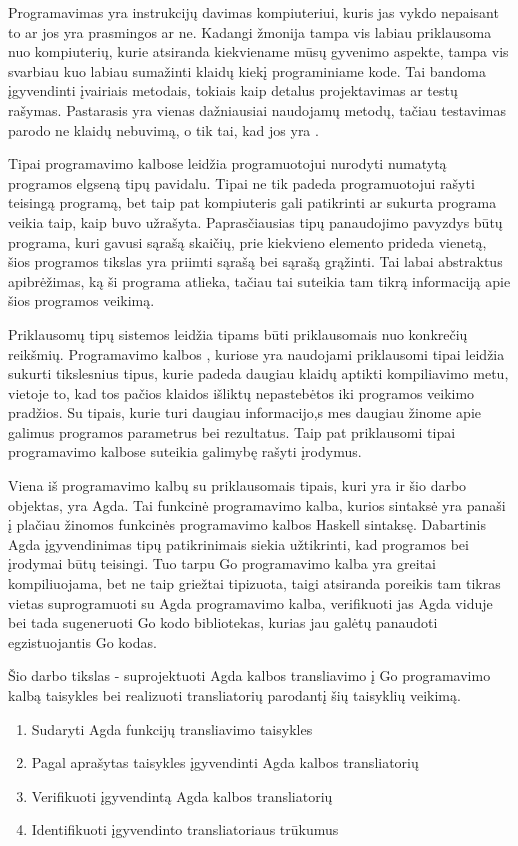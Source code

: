 \documentclass{VUMIFPSkursinis}
\begin{document}
\tableofcontents


Programavimas yra instrukcijų davimas kompiuteriui, kuris jas vykdo nepaisant to ar jos yra prasmingos ar ne. Kadangi žmonija tampa vis labiau priklausoma nuo kompiuterių, kurie atsiranda kiekviename mūsų gyvenimo aspekte, tampa vis svarbiau kuo labiau sumažinti klaidų kiekį programiniame kode. Tai bandoma įgyvendinti įvairiais metodais, tokiais kaip detalus projektavimas ar testų rašymas. Pastarasis yra vienas dažniausiai naudojamų metodų, tačiau testavimas parodo ne klaidų nebuvimą, o tik tai, kad jos yra \cite{UHC}.
\par Tipai programavimo kalbose leidžia programuotojui nurodyti numatytą programos elgseną tipų pavidalu. Tipai ne tik padeda programuotojui rašyti teisingą programą, bet taip pat kompiuteris gali patikrinti ar sukurta programa veikia taip, kaip buvo užrašyta. Paprasčiausias tipų panaudojimo pavyzdys būtų programa, kuri gavusi sąrašą skaičių, prie kiekvieno elemento prideda vienetą, šios programos tikslas yra priimti sąrašą bei sąrašą grąžinti. Tai labai abstraktus apibrėžimas, ką ši programa atlieka, tačiau tai suteikia tam tikrą informaciją apie šios programos veikimą.\par
Priklausomų tipų sistemos \cite{schematicApproach} leidžia tipams būti priklausomais nuo konkrečių reikšmių. Programavimo kalbos \cite{agda_book,idris}, kuriose yra naudojami priklausomi tipai leidžia sukurti tikslesnius tipus, kurie padeda daugiau klaidų aptikti kompiliavimo metu, vietoje to, kad tos pačios klaidos išliktų nepastebėtos iki programos veikimo pradžios. Su tipais, kurie turi daugiau informacijo,s mes daugiau žinome apie galimus programos parametrus bei rezultatus. Taip pat priklausomi tipai programavimo kalbose suteikia galimybę rašyti įrodymus.
\par Viena iš programavimo kalbų su priklausomais tipais, kuri yra ir šio darbo objektas, yra Agda. Tai funkcinė programavimo kalba, kurios sintaksė yra panaši į plačiau žinomos funkcinės programavimo kalbos Haskell \cite{haskell} sintaksę. Dabartinis Agda įgyvendinimas tipų patikrinimais siekia užtikrinti, kad programos bei įrodymai būtų teisingi. Tuo tarpu Go programavimo kalba \cite{Go} yra greitai kompiliuojama, bet ne taip griežtai tipizuota, taigi atsiranda poreikis tam tikras vietas suprogramuoti su Agda programavimo kalba, verifikuoti jas Agda viduje bei tada sugeneruoti Go kodo bibliotekas, kurias jau galėtų panaudoti egzistuojantis Go kodas.\par Šio darbo tikslas - suprojektuoti Agda kalbos transliavimo į Go programavimo kalbą taisykles bei realizuoti transliatorių parodantį šių taisyklių veikimą.
\begin{enumerate}[noitemsep]
	\item Sudaryti Agda funkcijų transliavimo taisykles
	\item Pagal aprašytas taisykles įgyvendinti Agda kalbos transliatorių
	\item Verifikuoti įgyvendintą Agda kalbos transliatorių
	\item Identifikuoti įgyvendinto transliatoriaus trūkumus 
\end{enumerate}
\end{document}

